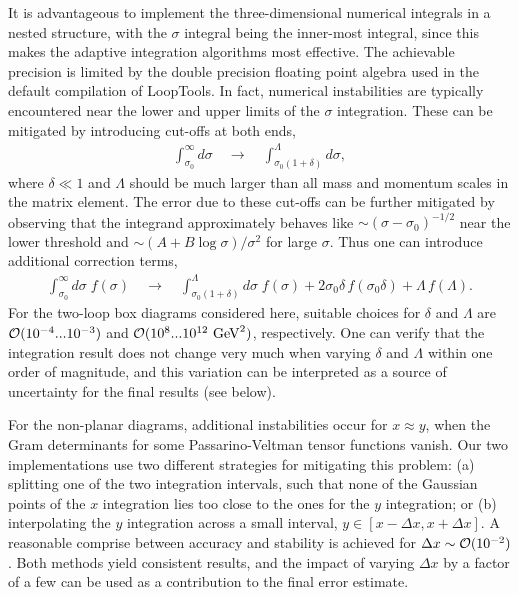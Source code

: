 \documentclass[12pt]{article}
\newcommand{\gev}{\,\, \mathrm{GeV}}
\begin{document}
It is advantageous to implement the three-dimensional numerical integrals in a
nested structure, with the $\sigma$ integral being the inner-most integral,
since this makes the adaptive integration algorithms most effective. The
achievable precision is limited by the double precision floating point algebra
used in the default compilation of {\sc LoopTools}. In fact, numerical
instabilities are typically encountered near the lower and upper limits of the
$\sigma$ integration. These can be mitigated by introducing cut-offs at both
ends,
\begin{align}
\int_{\sigma_0}^\infty d\sigma \quad\to\quad
\int_{\sigma_0(1+\delta)}^\Lambda d\sigma ,
\end{align}
where $\delta \ll 1$ and $\Lambda$ should be much larger than all mass and
momentum scales in the matrix element. The error due to these cut-offs can be
further mitigated by observing that the integrand approximately
behaves like $\sim (\sigma-\sigma_0)^{-1/2}$ near the lower threshold and
$\sim (A+B\log \sigma)/\sigma^2$ for large $\sigma$. Thus one can introduce
additional correction terms,
\begin{align}
\int_{\sigma_0}^\infty d\sigma \; f(\sigma) \quad\to\quad
\int_{\sigma_0(1+\delta)}^\Lambda d\sigma \; f(\sigma)
 + 2\sigma_0\delta\,f(\sigma_0\delta)+ \Lambda \, f(\Lambda).
\end{align}
For the two-loop box diagrams considered
here, suitable choices for $\delta$ and $\Lambda$ are ${\cal
O}(10^{-4}...10^{-3})$ and ${\cal O}(10^8...10^{12}\gev^2)$, respectively.
One can verify that the integration result does not change very much when 
varying $\delta$ and $\Lambda$ within one order of magnitude, and this variation
can be interpreted as a source of uncertainty for the final results (see below).

For the non-planar diagrams, additional instabilities occur for $x \approx y$,
when the Gram determinants for some Passarino-Veltman tensor functions vanish.
Our two implementations use two different strategies for mitigating this
problem: (a) splitting one of the two integration intervals, such that none
of the Gaussian points of the $x$ integration lies too close to the ones for the
$y$ integration; or (b) interpolating the $y$ integration across a small
interval, $y \in [x-\Delta x, x+\Delta x]$. A reasonable comprise between
accuracy and stability is achieved for $\Delta x \sim {\cal O}(10^{-2})$. Both
methods yield consistent results, and the impact of varying $\Delta x$ by a
factor of a few can be used as a contribution to the final error estimate.
\end{document}
